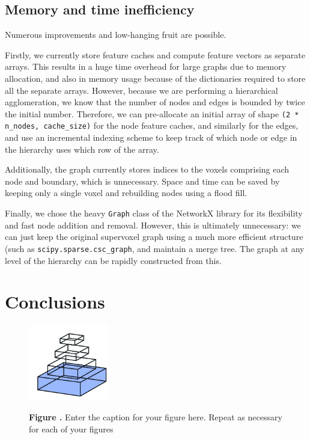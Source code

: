 \documentclass{frontiersSCNS} %
\begin{document}
\subsection{Memory and time inefficiency}

Numerous improvements and low-hanging fruit are possible.

Firstly, we currently store feature caches and compute feature vectors as separate arrays.
This results in a huge time overhead for large graphs due to memory allocation, and also in memory usage because of the dictionaries required to store all the separate arrays.
However, because we are performing a hierarchical agglomeration, we know that the number of nodes and edges is bounded by twice the initial number.
Therefore, we can pre-allocate an initial array of shape \texttt{(2 * n\_nodes, cache\_size)} for the node feature caches, and similarly for the edges, and use an incremental indexing scheme to keep track of which node or edge in the hierarchy uses which row of the array.

Additionally, the graph currently stores indices to the voxels comprising each node and boundary, which is unnecessary.
Space and time can be saved by keeping only a single voxel and rebuilding nodes using a flood fill.

Finally, we chose the heavy \texttt{Graph} class of the NetworkX library for its flexibility and fast node addition and removal.
However, this is ultimately unnecessary: we can just keep the original supervoxel graph using a much more efficient structure (such as \texttt{scipy.sparse.csc\_graph}, and maintain a merge tree.
The graph at any level of the hierarchy can be rapidly constructed from this.


\section{Conclusions}



\begin{figure}
\begin{center}
\includegraphics[width=3.5cm]{logo1}%
\end{center}
 \textbf{\label{fig:01} Figure .}{ Enter the caption for your figure here.  Repeat as  necessary for each of your figures }
\end{figure}
\end{document}
